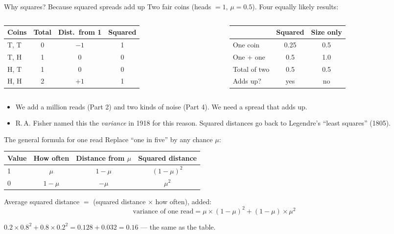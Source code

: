 \documentclass[aspectratio=169,11pt]{beamer}
\begin{document}
\begin{frame}{Why squares? Because squared spreads add up}
Two fair coins (heads $= 1$, $\mu = 0.5$). Four equally likely results:
\medskip

\begin{columns}[T]
\begin{column}{0.48\textwidth}
\small
\begin{tabular}{@{}lccc@{}}
\toprule
Coins & Total & Dist.\ from 1 & Squared\\
\midrule
T, T & 0 & $-1$ & 1\\
T, H & 1 & 0 & 0\\
H, T & 1 & 0 & 0\\
H, H & 2 & $+1$ & 1\\
\bottomrule
\end{tabular}
\end{column}
\begin{column}{0.50\textwidth}
\small
\begin{tabular}{@{}lcc@{}}
\toprule
& Squared & Size only\\
\midrule
One coin & 0.25 & 0.5\\
One + one & 0.5 & 1.0\\
Total of two & 0.5 & 0.5\\
\midrule
Adds up? & \alert{yes} & no\\
\bottomrule
\end{tabular}
\end{column}
\end{columns}
\medskip
\begin{itemize}\small
\item We add a million reads (Part 2) and two kinds of noise (Part 4). We
  need a spread that adds up.
\item R.\,A. Fisher named this the \emph{variance} in 1918 for this reason.
  Squared distances go back to Legendre's ``least squares'' (1805).
\end{itemize}
\end{frame}

\begin{frame}{The general formula for one read}
Replace ``one in five'' by any chance $\mu$:
\medskip

\begin{tabular}{@{}lccc@{}}
\toprule
Value & How often & Distance from $\mu$ & Squared distance\\
\midrule
1 & $\mu$ & $1-\mu$ & $(1-\mu)^2$\\
0 & $1-\mu$ & $-\mu$ & $\mu^2$\\
\bottomrule
\end{tabular}
\medskip

Average squared distance $=$ (squared distance $\times$ how often), added:
\[
\text{variance of one read} = \mu \times (1-\mu)^2 + (1-\mu) \times \mu^2
\]
\begin{worked}
$0.2 \times 0.8^2 + 0.8 \times 0.2^2 = 0.128 + 0.032 = 0.16$ --- the same as
the table.
\end{worked}
\end{frame}
\end{document}
